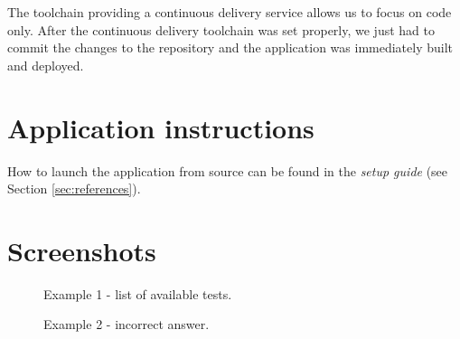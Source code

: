 \documentclass[11pt,a4paper]{article}
\begin{document}
The toolchain providing a continuous delivery service allows us to focus on code only. After the continuous delivery toolchain was set properly, we just had to commit the changes to the repository and the application was immediately built and deployed.

\section{Application instructions}

How to launch the application from source can be found in the \textit{setup guide} (see Section \ref{sec:references}).

\section{Screenshots}

\begin{figure}[H]
    \centering
    \caption{Example 1 - list of available tests.}
    \label{fig:example1}
\end{figure}

\begin{figure}[H]
    \centering
    \caption{Example 2 - incorrect answer.}
    \label{fig:example2}
\end{figure}
\end{document}
